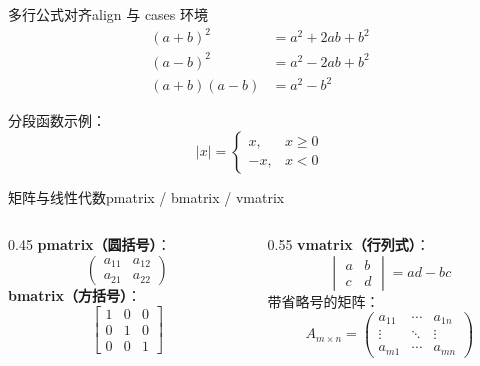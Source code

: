 \documentclass[UTF8,11pt,aspectratio=169]{beamer}
\begin{document}
\begin{frame}{多行公式对齐}{align 与 cases 环境}
    \begin{align}
        (a + b)^2 &= a^2 + 2ab + b^2             \label{eq:binomial1} \\
        (a - b)^2 &= a^2 - 2ab + b^2             \label{eq:binomial2} \\
        (a + b)(a - b) &= a^2 - b^2              \label{eq:binomial3}
    \end{align}

    分段函数示例：
    \[
        |x| =
        \begin{cases}
             x,  & x \geq 0 \\
            -x,  & x < 0
        \end{cases}
    \]
\end{frame}

\begin{frame}{矩阵与线性代数}{pmatrix / bmatrix / vmatrix}
    \begin{columns}[T]
        \begin{column}{0.45\textwidth}
            \textbf{pmatrix（圆括号）}：
            \[
            \begin{pmatrix}
                a_{11} & a_{12} \\
                a_{21} & a_{22}
            \end{pmatrix}
            \]
            \textbf{bmatrix（方括号）}：
            \[
            \begin{bmatrix}
                1 & 0 & 0 \\
                0 & 1 & 0 \\
                0 & 0 & 1
            \end{bmatrix}
            \]
        \end{column}
        \begin{column}{0.55\textwidth}
            \textbf{vmatrix（行列式）}：
            \[
            \begin{vmatrix}
                a & b \\
                c & d
            \end{vmatrix}
            = ad - bc
            \]
            带省略号的矩阵：
            \[
            A_{m \times n} =
            \begin{pmatrix}
                a_{11} & \cdots & a_{1n} \\
                \vdots & \ddots & \vdots \\
                a_{m1} & \cdots & a_{mn}
            \end{pmatrix}
            \]
        \end{column}
    \end{columns}
\end{frame}
\end{document}
